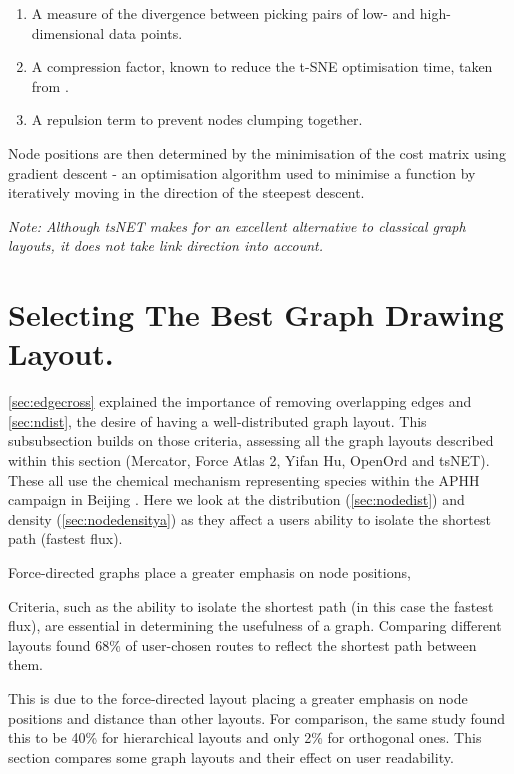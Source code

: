 \begin{enumerate}
    \item A measure of the divergence between picking pairs of low- and high-dimensional data points.
    \item A compression factor, known to reduce the t-SNE optimisation time, taken from \citep{tsnetcompression}.
    \item A repulsion term to prevent nodes clumping together.
\end{enumerate}

Node positions are then determined by the minimisation of the cost matrix using gradient descent - an optimisation algorithm used to minimise a function by iteratively moving in the direction of the steepest descent.

\textit{Note: Although tsNET makes for an excellent alternative to classical graph layouts, it does not take link direction into account. }



\section{Selecting The Best Graph Drawing Layout.}

\autoref{sec:edgecross} explained the importance of removing overlapping edges and \autoref{sec:ndist}, the desire of having a well-distributed graph layout. This subsubsection builds on those criteria, assessing all the graph layouts described within this section (Mercator, Force Atlas 2, Yifan Hu, OpenOrd and tsNET). These all use the chemical mechanism representing species within the APHH campaign in Beijing \citep{aphh}. Here we look at the distribution (\autoref{sec:nodedist}) and density (\autoref{sec:nodedensitya}) as they affect a users ability to isolate the shortest path (fastest flux).

 Force-directed graphs place a greater emphasis on node positions,





Criteria, such as the ability to isolate the shortest path (in this case the fastest flux), are essential in determining the usefulness of a graph. Comparing different layouts \citep{eyetrack} found 68\% of user-chosen routes to reflect the shortest path between them.

This is due to the force-directed layout placing a greater emphasis on node positions and distance than other layouts. For comparison, the same study found this to be 40\% for hierarchical layouts and only 2\% for orthogonal ones. This section compares some graph layouts and their effect on user readability.


